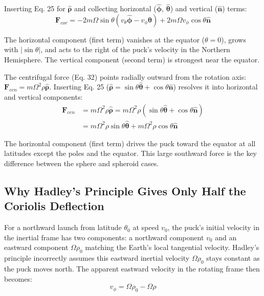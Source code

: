 \documentclass[10pt, a4paper]{article}
\begin{document}
Inserting Eq. 25 for $\hat{\boldsymbol{\rho}}$ and collecting horizontal ($\hat{\boldsymbol{\phi}}$, $\hat{\boldsymbol{\theta}}$) and vertical ($\hat{\mathbf{n}}$) terms:
\begin{equation}
\mathbf{F}_{cor} = -2m\Omega \sin\theta (v_\theta \hat{\boldsymbol{\phi}} - v_\phi \hat{\boldsymbol{\theta}}) + 2m\Omega v_\phi \cos\theta \hat{\mathbf{n}} \label{eq:26b}
\end{equation}

The horizontal component (first term) vanishes at the equator ($\theta = 0$), grows with $|\sin\theta|$, and acts to the right of the puck’s velocity in the Northern Hemisphere. The vertical component (second term) is strongest near the equator. 

The centrifugal force (Eq. 32) points radially outward from the rotation axis: $\mathbf{F}_{cen} = m\Omega^2\rho\hat{\boldsymbol{\rho}}$. Inserting Eq. 25 ($\hat{\boldsymbol{\rho}} = \sin\theta \hat{\boldsymbol{\theta}} + \cos\theta \hat{\mathbf{n}}$) resolves it into horizontal and vertical components:
\begin{align}
\mathbf{F}_{cen} &= m\Omega^2\rho\hat{\boldsymbol{\rho}} = m\Omega^2\rho(\sin\theta\hat{\boldsymbol{\theta}} + \cos\theta\hat{\mathbf{n}}) \nonumber \\
&= m\Omega^2\rho\sin\theta\hat{\boldsymbol{\theta}} + m\Omega^2\rho\cos\theta\hat{\mathbf{n}} \label{eq:33}
\end{align}

The horizontal component (first term) drives the puck toward the equator at all latitudes except the poles and the equator. This large southward force is the key difference between the sphere and spheroid cases.

\subsection{Why Hadley’s Principle Gives Only Half the Coriolis Deflection}
For a northward launch from latitude $\theta_0$ at speed $v_0$, the puck’s initial velocity in the inertial frame has two components: a northward component $v_0$ and an eastward component $\Omega\rho_0$ matching the Earth’s local tangential velocity. Hadley’s principle incorrectly assumes this eastward inertial velocity $\Omega\rho_0$ stays constant as the puck moves north. The apparent eastward velocity in the rotating frame then becomes:
\begin{equation}
v_\phi = \Omega\rho_0 - \Omega\rho \label{eq:28}
\end{equation}
\end{document}
